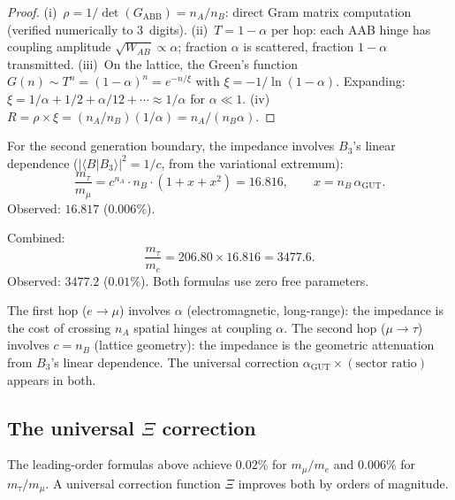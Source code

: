 \begin{proof}
(i)~$\rho = 1/\det(G_\mathrm{ABB}) = n_A/n_B$: direct Gram matrix computation (verified numerically to 3~digits). (ii)~$T = 1 - \alpha$ per hop: each AAB hinge has coupling amplitude $\sqrt{W_{AB}} \propto \alpha$; fraction $\alpha$ is scattered, fraction $1-\alpha$ transmitted. (iii)~On the lattice, the Green's function $G(n) \sim T^n = (1-\alpha)^n = e^{-n/\xi}$ with $\xi = -1/\ln(1-\alpha)$.  Expanding: $\xi = 1/\alpha + 1/2 + \alpha/12 + \cdots \approx 1/\alpha$ for $\alpha \ll 1$. (iv)~$R = \rho \times \xi = (n_A/n_B)(1/\alpha) = n_A/(n_B\alpha)$.
\end{proof}

For the second generation boundary, the impedance involves $B_3$'s linear dependence ($|\langle B|B_3\rangle|^2 = 1/c$, from the variational extremum):
\begin{equation}
\label{eq:tau_mu}
\boxed{\frac{m_\tau}{m_\mu} = c^{n_A}\cdot n_B \cdot \left(1 + x + x^2\right) = 16.816, \qquad x = n_B\,\alpha_\mathrm{GUT}.}
\end{equation}
Observed: $16.817$ ($0.006\%$).

Combined:
\begin{equation}
\label{eq:tau_e}
\frac{m_\tau}{m_e} = 206.80 \times 16.816 = 3477.6.
\end{equation}
Observed: $3477.2$ ($0.01\%$).  Both formulas use zero free parameters.

\begin{remark}
The first hop ($e \to \mu$) involves $\alpha$ (electromagnetic, long-range): the impedance is the cost of crossing $n_A$ spatial hinges at coupling $\alpha$.  The second hop ($\mu \to \tau$) involves $c = n_B$ (lattice geometry): the impedance is the geometric attenuation from $B_3$'s linear dependence.  The universal correction $\alpha_\mathrm{GUT} \times (\text{sector ratio})$ appears in both.
\end{remark}

\subsection{The universal $\Xi$ correction}
\label{sec:xi_correction}

The leading-order formulas above achieve $0.02\%$ for $m_\mu/m_e$ and $0.006\%$ for $m_\tau/m_\mu$.  A universal correction function $\Xi$ improves both by orders of magnitude.

